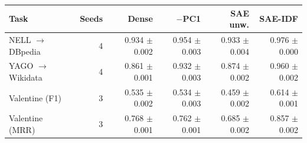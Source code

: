 \begin{tabular}{@{}lrrrrr@{}}
\toprule
Task & Seeds & Dense & $-$PC1 & SAE unw. & \textbf{SAE-IDF} \\
\midrule
NELL $\to$ DBpedia & 4 & 0.934 $\pm$ 0.002 & 0.954 $\pm$ 0.003 & 0.933 $\pm$ 0.004 & 0.976 $\pm$ 0.000 \\
YAGO $\to$ Wikidata & 4 & 0.861 $\pm$ 0.001 & 0.932 $\pm$ 0.003 & 0.874 $\pm$ 0.002 & 0.960 $\pm$ 0.002 \\
Valentine (F1) & 3 & 0.535 $\pm$ 0.002 & 0.534 $\pm$ 0.003 & 0.459 $\pm$ 0.002 & 0.614 $\pm$ 0.001 \\
Valentine (MRR) & 3 & 0.768 $\pm$ 0.001 & 0.762 $\pm$ 0.001 & 0.685 $\pm$ 0.002 & 0.857 $\pm$ 0.002 \\
\bottomrule
\end{tabular}
